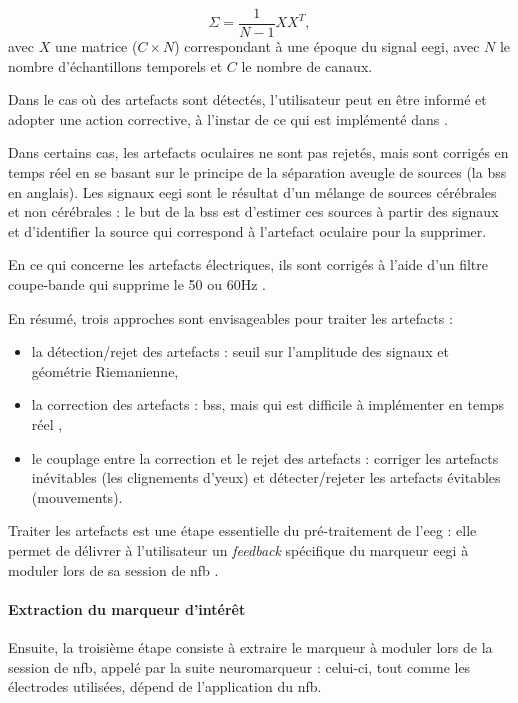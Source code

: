 \begin{equation}
\label{eq:introduction_covariance_matrix}
\Sigma = \frac{1}{N - 1}XX^T,
\end{equation}
avec $X$ une matrice ($C \times N$) correspondant à une époque du signal \gls{eegi}, avec $N$ le nombre d'échantillons temporels et $C$ le nombre de canaux. 

Dans le cas où des artefacts sont détectés, l'utilisateur peut en être informé et adopter une action corrective, à l'instar de ce qui est implémenté dans 
\citet{Bioulac2019}.

Dans certains cas, les artefacts oculaires ne sont pas rejetés, mais sont corrigés en temps réel \citep{Barthelemy2017, Maurizio2014, Bioulac2019} en se basant sur
le principe de la séparation aveugle de sources (la \gls{bss} en anglais). Les signaux \gls{eegi} sont le résultat d'un mélange de sources cérébrales et non cérébrales : le but 
de la \gls{bss} est d'estimer ces sources à partir des signaux et d'identifier la source qui correspond à l'artefact oculaire pour la supprimer.

En ce qui concerne les artefacts électriques, ils sont corrigés à l'aide d'un filtre coupe-bande qui supprime le 50 ou 60Hz \citep{Bioulac2019}.

En résumé, trois approches sont envisageables pour traiter les artefacts :
\begin{itemize}
\item la détection/rejet des artefacts : seuil sur l'amplitude des signaux et géométrie Riemanienne,
\item la correction des artefacts : \gls{bss}, mais qui est difficile à implémenter en temps réel \citep{Barthelemy2017},
\item le couplage entre la correction et le rejet des artefacts : corriger les artefacts inévitables (les clignements d'yeux) 
et détecter/rejeter les artefacts évitables (mouvements).
\end{itemize}

Traiter les artefacts est une étape essentielle du pré-traitement de l'\gls{eeg} : elle permet de délivrer à l'utilisateur un \textit{feedback} 
spécifique du marqueur \gls{eegi} à moduler lors de sa session de \gls{nfb} \citep{Barthelemy2019}. 

\paragraph{Extraction du marqueur d'intérêt}
Ensuite, la troisième étape consiste à extraire le marqueur à moduler lors de la session de \gls{nfb}, appelé par la suite neuromarqueur : 
celui-ci, tout comme les électrodes utilisées, dépend de l'application du \gls{nfb}. 


